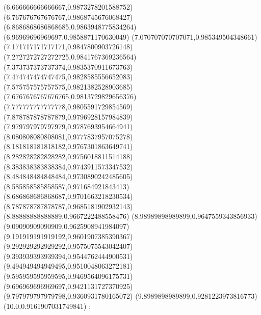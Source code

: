 {(6.666666666666667,0.9873278201588752)
(6.767676767676767,0.9868745676068427)
(6.8686868686868685,0.9863948775834264)
(6.96969696969697,0.9858871170630049)
(7.070707070707071,0.985349504348661)
(7.171717171717171,0.9847800903726148)
(7.2727272727272725,0.9841767369236564)
(7.373737373737374,0.9835370911673763)
(7.474747474747475,0.9828585556652083)
(7.575757575757575,0.9821382528903685)
(7.6767676767676765,0.9813729829656376)
(7.777777777777778,0.9805591729854569)
(7.878787878787879,0.9796928157984839)
(7.979797979797979,0.9787693954664941)
(8.080808080808081,0.9777837957075278)
(8.181818181818182,0.9767301863649741)
(8.282828282828282,0.9756018811514188)
(8.383838383838384,0.9743911573347532)
(8.484848484848484,0.9730890242485605)
(8.585858585858587,0.971684921843413)
(8.686868686868687,0.9701663218230534)
(8.787878787878787,0.9685181902932143)
(8.88888888888889,0.9667222488558476)
(8.98989898989899,0.9647559343856933)
(9.09090909090909,0.9625908941984097)
(9.191919191919192,0.9601907385390367)
(9.292929292929292,0.9575075543042407)
(9.393939393939394,0.9544762444900531)
(9.494949494949495,0.9510048063272181)
(9.595959595959595,0.9469564096175731)
(9.696969696969697,0.9421131727370925)
(9.797979797979798,0.9360931780165072)
(9.8989898989899,0.9281223973816773)
(10.0,0.9161907031749841)
};
